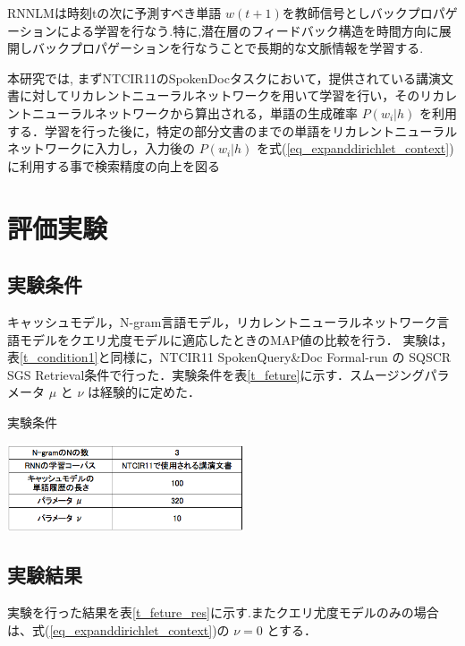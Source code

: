 
RNNLMは時刻tの次に予測すべき単語 $w(t+1)$を教師信号としバックプロパゲーションによる学習を行なう.特に,潜在層のフィードバック構造を時間方向に展開しバックプロパゲーションを行なうことで長期的な文脈情報を学習する.

本研究では, まずNTCIR11のSpokenDocタスクにおいて，提供されている講演文書に対してリカレントニューラルネットワークを用いて学習を行い，そのリカレントニューラルネットワークから算出される，単語の生成確率 $P(w_i|h)$ を利用する．学習を行った後に，特定の部分文書のまでの単語をリカレントニューラルネットワークに入力し，入力後の $P(w_i|h)$ を式(\ref{eq_expanddirichlet_context})に利用する事で検索精度の向上を図る

\section{評価実験}
\subsection{実験条件}

キャッシュモデル，N-gram言語モデル，リカレントニューラルネットワーク言語モデルをクエリ尤度モデルに適応したときのMAP値の比較を行う．
実験は，表\ref{t_condition1}と同様に，NTCIR11 SpokenQuery\&Doc Formal-run の SQSCR SGS Retrieval条件で行った．実験条件を表\ref{t_feture}に示す．スムージングパラメータ $\mu$ と $\nu$ は経験的に定めた．

\begin{table}[h]
    \centering
    \caption{実験条件}
    \includegraphics[width=7cm]{./image/t_feature1.png}
    \label{t_feture}
\end{table}

\subsection{実験結果}

実験を行った結果を表\ref{t_feture_res}に示す.またクエリ尤度モデルのみの場合は、式(\ref{eq_expanddirichlet_context})の $\nu = 0$ とする．

